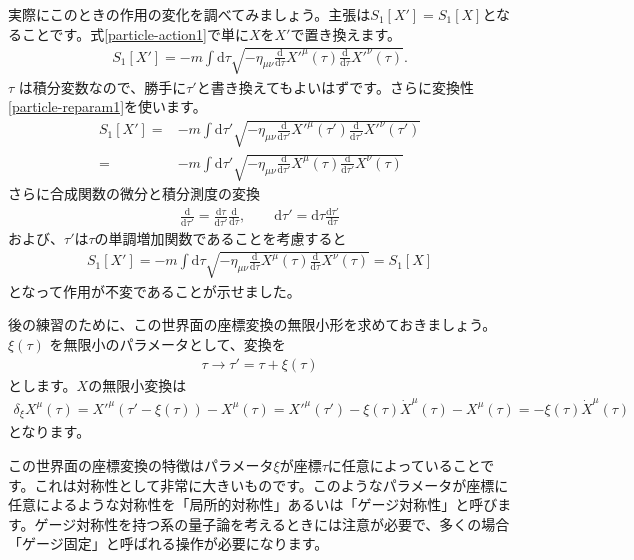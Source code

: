 \documentclass[report,paper=a4, fontsize=12pt, line_length=16cm, number_of_lines=34,dvipdfmx]{jlreq}
\numberwithin{equation}{chapter}
\numberwithin{equation}{section}
\newcommand{\di}{\mathrm{d}}
\begin{document}
実際にこのときの作用の変化を調べてみましょう。主張は$S_{1}[X']=S_{1}[X]$となることです。式\eqref{particle-action1}で単に$X$を$X'$で置き換えます。
\begin{align}
 S_{1}[X']=-m\int \di \tau \sqrt{-\eta_{\mu\nu}\frac{\di}{\di\tau}X'^{\mu}(\tau) \frac{\di}{\di\tau}X'^{\nu}(\tau)}.
\end{align}
$\tau$ は積分変数なので、勝手に$\tau'$と書き換えてもよいはずです。さらに変換性\eqref{particle-reparam1}を使います。
\begin{align}
 S_{1}[X']
=&-m\int \di \tau' \sqrt{-\eta_{\mu\nu}\frac{\di}{\di\tau'}X'^{\mu}(\tau') \frac{\di}{\di\tau'}X'^{\nu}(\tau')}\\
=&-m\int \di \tau' \sqrt{-\eta_{\mu\nu}\frac{\di}{\di\tau'}X^{\mu}(\tau) \frac{\di}{\di\tau'}X^{\nu}(\tau)}
\end{align}
さらに合成関数の微分と積分測度の変換
\begin{align}
 \frac{\di}{\di \tau'}=\frac{\di \tau}{\di \tau'}\frac{\di}{\di\tau},\qquad \di \tau'=\di \tau\frac{\di \tau'}{\di \tau}
\end{align}
および、$\tau'$は$\tau$の単調増加関数であることを考慮すると
\begin{align}
 S_{1}[X']
=-m\int \di\tau \sqrt{-\eta_{\mu\nu}\frac{\di}{\di\tau}X^{\mu}(\tau) \frac{\di}{\di\tau}X^{\nu}(\tau)}
=S_{1}[X]
\end{align}
となって作用が不変であることが示せました。



後の練習のために、この世界面の座標変換の無限小形を求めておきましょう。
$\xi(\tau)$ を無限小のパラメータとして、変換を
\begin{align}
 \tau \to \tau'=\tau+\xi(\tau)
\end{align}
とします。$X$の無限小変換は
\begin{align}
 \delta_{\xi} X^{\mu}(\tau)
=X'^{\mu}(\tau'-\xi(\tau))-X^{\mu}(\tau)
=X'^{\mu}(\tau')-\xi(\tau) \dot{X}^{\mu}(\tau)-X^{\mu}(\tau)
=-\xi(\tau) \dot{X}^{\mu}(\tau)
\end{align}
となります。

この世界面の座標変換の特徴はパラメータ$\xi$が座標$\tau$に任意によっていることです。これは対称性として非常に大きいものです。このようなパラメータが座標に任意によるような対称性を「局所的対称性」あるいは「ゲージ対称性」と呼びます。ゲージ対称性を持つ系の量子論を考えるときには注意が必要で、多くの場合「ゲージ固定」と呼ばれる操作が必要になります。
\end{document}
